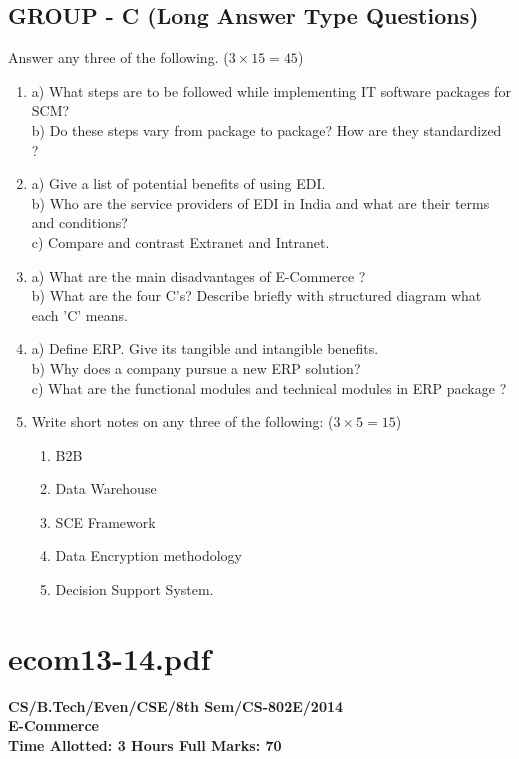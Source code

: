 \subsection*{GROUP - C (Long Answer Type Questions)}
Answer any three of the following. ($3 \times 15 = 45$)
\begin{enumerate}
    \item[7.] 
    a) What steps are to be followed while implementing IT software packages for SCM? \\
    b) Do these steps vary from package to package? How are they standardized ?
    \item[8.] 
    a) Give a list of potential benefits of using EDI. \\
    b) Who are the service providers of EDI in India and what are their terms and conditions? \\
    c) Compare and contrast Extranet and Intranet.
    \item[9.] 
    a) What are the main disadvantages of E-Commerce ? \\
    b) What are the four C's? Describe briefly with structured diagram what each 'C' means.
    \item[10.] 
    a) Define ERP. Give its tangible and intangible benefits. \\
    b) Why does a company pursue a new ERP solution? \\
    c) What are the functional modules and technical modules in ERP package ?
    \item[11.] Write short notes on any three of the following: ($3 \times 5 = 15$)
    \begin{enumerate}
        \item[a)] B2B
        \item[b)] Data Warehouse
        \item[c)] SCE Framework
        \item[d)] Data Encryption methodology
        \item[e)] Decision Support System.
    \end{enumerate}
\end{enumerate}

\newpage
\section*{ecom13-14.pdf}
\textbf{CS/B.Tech/Even/CSE/8th Sem/CS-802E/2014} \\
\textbf{E-Commerce} \\
\textbf{Time Allotted: 3 Hours \hfill Full Marks: 70}

